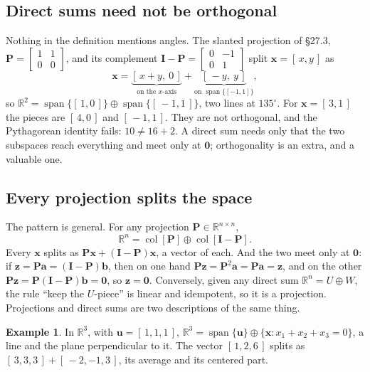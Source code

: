 \documentclass[11pt]{article}
\theoremstyle{plain}
\theoremstyle{definition}
\newtheorem{ex}{Example}[section]
\theoremstyle{remark}
\newcommand{\R}{\mathbb{R}}
\newcommand{\vc}[1]{\mathbf{#1}}
\newcommand{\mt}[1]{\mathbf{#1}}
\newcommand{\colsp}[1]{\operatorname{col}[#1]}
\DeclareMathOperator{\spanop}{span}
\begin{document}
\subsection{Direct sums need not be orthogonal}
Nothing in the definition mentions angles. The slanted projection of \S27.3,
$\mt{P}=\begin{bmatrix}1&1\\0&0\end{bmatrix}$, and its complement
$\mt{I}-\mt{P}=\begin{bmatrix}0&-1\\0&1\end{bmatrix}$ split
$\vc{x}=[\,x,y\,]$ as
\[
  \vc{x}=\underbrace{[\,x+y,\ 0\,]}_{\text{on the }x\text{-axis}}
        +\underbrace{[\,-y,\ y\,]}_{\text{on }\spanop\{[-1,1]\}},
\]
so $\R^{2}=\spanop\{[\,1,0\,]\}\oplus\spanop\{[\,-1,1\,]\}$, two lines at
$135^\circ$. For $\vc{x}=[\,3,1\,]$ the pieces are $[\,4,0\,]$ and $[\,-1,1\,]$.
They are not orthogonal, and the Pythagorean identity fails: $10\neq16+2$. A
direct sum needs only that the two subspaces reach everything and meet only at
$\vc{0}$; orthogonality is an extra, and a valuable one.

\subsection{Every projection splits the space}
The pattern is general. For any projection $\mt{P}\in\R^{n\times n}$,
\[
  \R^{n}=\colsp{\mt{P}}\oplus\colsp{\mt{I}-\mt{P}} .
\]
Every $\vc{x}$ splits as $\mt{P}\vc{x}+(\mt{I}-\mt{P})\vc{x}$, a vector of each.
And the two meet only at $\vc{0}$: if $\vc{z}=\mt{P}\vc{a}=(\mt{I}-\mt{P})\vc{b}$,
then on one hand $\mt{P}\vc{z}=\mt{P}^{2}\vc{a}=\mt{P}\vc{a}=\vc{z}$, and on the
other $\mt{P}\vc{z}=\mt{P}(\mt{I}-\mt{P})\vc{b}=\vc{0}$, so $\vc{z}=\vc{0}$.
Conversely, given any direct sum $\R^{n}=U\oplus W$, the rule ``keep the
$U$-piece'' is linear and idempotent, so it is a projection. Projections and
direct sums are two descriptions of the same thing.

\begin{ex}
In $\R^{3}$, with $\vc{u}=[\,1,1,1\,]$,
$\R^{3}=\spanop\{\vc{u}\}\oplus\{\vc{x}:x_1+x_2+x_3=0\}$, a line and the plane
perpendicular to it. The vector $[\,1,2,6\,]$ splits as
$[\,3,3,3\,]+[\,-2,-1,3\,]$, its average and its centered part.
\end{ex}
\end{document}
